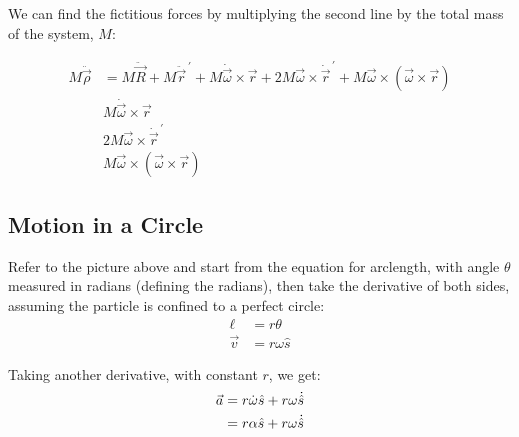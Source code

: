 \documentclass[10pt]{article}
\begin{document}
We can find the fictitious forces by multiplying the second 
line by the total mass of the system, $M$:

\begin{align}
    M\ddot{\vec{\rho}} 
        &= M\ddot{\vec{R}} + M\ddot{\vec{r}}^{\,\prime} +
        M\dot{\vec{\omega}}\times\vec{r} + 
        2M\vec{\omega}\times\dot{\vec{r}}^{\,\prime} + 
        M\vec{\omega}\times(\vec{\omega}\times\vec{r}) \\
    &M\dot{\vec{\omega}}\times\vec{r} \tag{transverse ``force''} \\
    &2M\vec{\omega}\times\dot{\vec{r}}^{\,\prime} \tag{coriolis ``force''} \\
    &M\vec{\omega}\times(\vec{\omega}\times\vec{r}) \tag{centrifugal ``force''}
\end{align}


\subsection{Motion in a Circle}\label{apx:motioncircle}

\begin{figure}[H]
\begin{center}
\end{center}
\end{figure}

Refer to the picture above and 
start from the equation for arclength, with angle $\theta$ measured 
in radians (defining the radians), then take the derivative of both sides, 
assuming the particle is confined to a perfect circle:
\begin{align}
    \ell &= r\theta \\
    \vec{v} &= r\omega\hat{s}
\end{align}

Taking another derivative, with constant $r$, we get:
\begin{align}
    \vec{a} &= r\dot{\omega}\hat{s} + r\omega\dot{\hat{s}} \notag\\
    &= r\alpha\hat{s} + r\omega\dot{\hat{s}}
\end{align}
\end{document}
